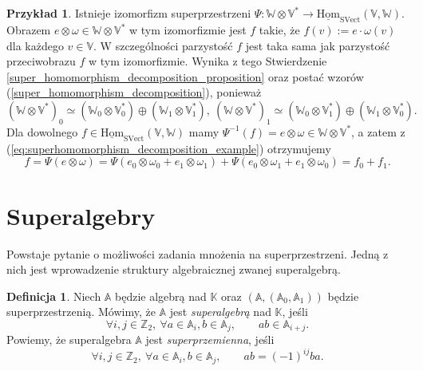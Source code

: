 \documentclass[11pt,a4paper]{report}
\theoremstyle{definition}
\newtheorem{example}[theorem]{Przykład}
\newtheorem{definition}[theorem]{Definicja}
\begin{document}
\begin{example}
Istnieje izomorfizm superprzestrzeni $\Psi: \mathbb{W} \otimes \mathbb{V}^* \rightarrow \underline{\mathrm{Hom}}_{\mathrm{SVect}}(\mathbb{V},\mathbb{W})$. Obrazem $e \otimes \omega \in \mathbb{W} \otimes \mathbb{V}^*$ w tym izomorfizmie jest $f$ takie, że $f(v) := e \cdot \omega(v)$ dla każdego $v \in \mathbb{V}$. W szczególności parzystość $f$ jest taka sama jak parzystość przeciwobrazu $f$ w tym izomorfizmie. Wynika z tego Stwierdzenie \ref{super_homomorphism_decomposition_proposition} oraz postać wzorów (\ref{super_homomorphism_decomposition}), ponieważ
\begin{equation}
\label{eq:superhomomorphism_decomposition_example}
(\mathbb{W} \otimes \mathbb{V}^{*})_0 \simeq (\mathbb{W}_0 \otimes \mathbb{V}_0^{*}) \oplus (\mathbb{W}_1 \otimes \mathbb{V}_1^{*}),\ (\mathbb{W} \otimes \mathbb{V}^{*})_1 \simeq (\mathbb{W}_0 \otimes \mathbb{V}_1^{*}) \oplus (\mathbb{W}_1 \otimes \mathbb{V}_0^{*}).
\end{equation}
Dla dowolnego $f \in \underline{\mathrm{Hom}}_{\mathrm{SVect}}(\mathbb{V},\mathbb{W})$ mamy $\Psi^{-1}(f) = e\otimes \omega \in \mathbb{W} \otimes \mathbb{V}^*$, a zatem z (\ref{eq:superhomomorphism_decomposition_example}) otrzymujemy $$f = \Psi(e \otimes \omega) = \Psi (e_0 \otimes \omega_0 + e_1 \otimes \omega_1) + \Psi (e_0 \otimes \omega_1 + e_1 \otimes \omega_0) = f_0 + f_1.$$

\end{example}

\section{Superalgebry}

Powstaje pytanie o możliwości zadania mnożenia na superprzestrzeni. Jedną z nich jest wprowadzenie struktury algebraicznej zwanej superalgebrą.

\begin{definition}
\label{def:superalgebra}
Niech $\mathbb{A}$ będzie algebrą nad $\mathbb{K}$ oraz $(\mathbb{A}, (\mathbb{A}_0, \mathbb{A}_1))$ będzie superprzestrzenią. Mówimy, że $\mathbb{A}$ jest \textit{superalgebrą} nad  $\mathbb{K}$, jeśli
\begin{equation*}
\forall i,j \in \mathbb{Z}_2,\ \forall a \in \mathbb{A}_i, b \in \mathbb{A}_j, \qquad ab \in \mathbb{A}_{i+j}.
\end{equation*}
Powiemy, że superalgebra $\mathbb{A}$ jest \textit{superprzemienna}, jeśli
\begin{equation*}
\forall i,j \in \mathbb{Z}_2,\ \forall a \in \mathbb{A}_i, b \in \mathbb{A}_j, \qquad ab = (-1)^{ij} ba.
\end{equation*}
\end{definition}
\end{document}
